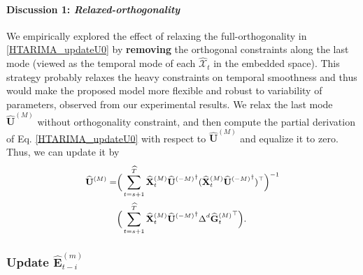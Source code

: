\documentclass[letterpaper]{article} %
\numberwithin{theorem}{section}
\newcommand{\ten}[1]{ \boldsymbol{\mathcal #1}}
\begin{document}
\paragraph{\textbf{Discussion 1}: \textit{Relaxed-orthogonality}}
We empirically explored the effect of  relaxing the  full-orthogonality  in  \eqref{HTARIMA_updateU0} by  \textbf{removing} the orthogonal constraints along the last  mode (viewed as the temporal mode of each $\widehat{\ten{X}}_t$ in the embedded space). This  strategy   probably  relaxes  the heavy constraints on temporal smoothness and thus would make the proposed model more flexible and  robust  to  variability of  parameters, observed from  our experimental results.  We relax the last mode $\widehat{\mathbf U}^{(M)}$ without orthogonality constraint,  and then compute the partial derivation of  Eq. \eqref{HTARIMA_updateU0} with respect to $\widehat{\mathbf U}^{(M)}$  and  equalize it to zero. Thus, we can update it by
\begin{equation}\label{HTARIMA_UpdateUM}
\small
\begin{aligned}
\widehat{ \mathbf U}{^{(M)}}        = &  \Big(\hspace{-0.01cm}  \sum_{t=s+1}^{\widehat{T}} {\widehat{\mathbf{X}}^{(M)}_{t}}      \widehat{ \mathbf U}{^{(-M)}}^\dagger  ({\widehat{\mathbf{X}}^{(M)}_{t}}      \widehat{ \mathbf U}{^{(-M)}}^\dagger)^\top  \hspace{-0.01cm}  \Big)^{-1}  \\&   \Big(\hspace{-0.01cm}  \sum_{t=s+1}^{\widehat{T}} {\widehat{\mathbf{X}}^{(M)}_{t}}      \widehat{ \mathbf U}{^{(-M)}}^\dagger \Delta^d  {\widehat{\mathbf{G}}{^{(M)}_{t}}}^\top   \hspace{-0.01cm}   \Big).
\end{aligned}
\end{equation}


\subsubsection{Update  $\widehat{\mathbf{E}}^{(m)}_{{t-i}} $  }
\end{document}
